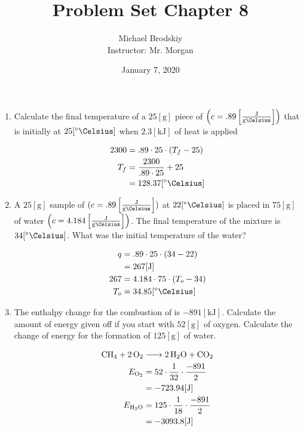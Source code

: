 \documentclass[12pt]{article}
\title{Problem Set Chapter 8}
\date{January 7, 2020}
\author{Michael Brodskiy\\ \small Instructor: Mr. Morgan}
\begin{document}
\maketitle

\begin{enumerate}

  \item Calculate the final temperature of a $25[\si{\gram}]$ piece of  $\left(c=.89\left[ \frac{\si{\joule}}{\si{\gram\Celsius}} \right]\right)$ that is initially at $25[\si{\degree\Celsius}]$ when $2.3[\si{\kilo\joule}]$ of heat is applied

    \begin{equation}
      \begin{split}
        2300&=.89\cdot25\cdot(T_f-25)\\
        T_f&=\frac{2300}{.89\cdot25}+25\\
        &=128.37[\si{\degree\Celsius}]
      \end{split}
      \label{1}
    \end{equation}

  \item A $25[\si{\gram}]$ sample of  $(c=.89\left[ \frac{\si{\joule}}{\si{\gram\Celsius}} \right])$ at $22[\si{\degree\Celsius}]$ is placed in $75[\si{\gram}]$ of water $\left(c=4.184\left[ \frac{\si{\joule}}{\si{\gram\Celsius}} \right]\right)$. The final temperature of the mixture is $34[\si{\degree\Celsius}]$. What was the initial temperature of the water?

    \begin{equation}
      \begin{split}
        q&=.89\cdot25\cdot(34-22)\\
        &=267[\si{\joule}]\\
        267&=4.184\cdot75\cdot(T_o-34)\\
        T_o&=34.85[\si{\degree\Celsius}]
      \end{split}
      \label{2}
    \end{equation}

  \item The enthalpy change for the combustion of  is $-891[\si{\kilo\joule}]$. Calculate the amount of energy given off if you start with $52[\si{\gram}]$ of oxygen. Calculate the change of energy for the formation of $125[\si{\gram}]$ of water.

    \begin{equation}
      \begin{split}
        \ce{CH4 + 2O2 &-> 2H2O + CO2}\\
        E_{\ce{O2}}&=52\cdot\frac{1}{32}\cdot\frac{-891}{2}\\
        &=-723.94[\si{\joule}]\\
        E_{\ce{H2O}}&=125\cdot\frac{1}{18}\cdot\frac{-891}{2}\\
        &=-3093.8[\si{\joule}]
      \end{split}
      \label{3}
    \end{equation}


\end{enumerate}
\end{document}
